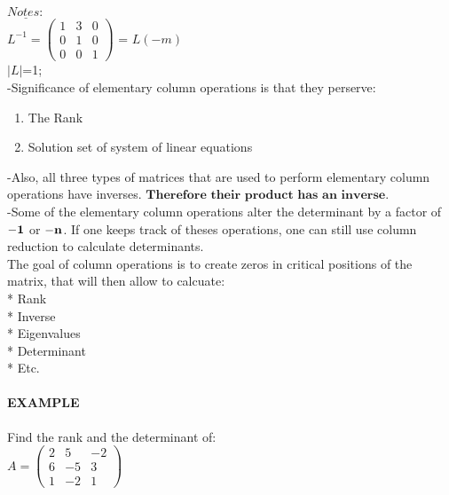 \documentclass[]{article}
\let\oldparagraph\paragraph
\renewcommand{\paragraph}[1]{\oldparagraph{#1}\mbox{}}
\begin{document}
\(\underline{Notes:}\)\\

\(L^{-1} =\begin{pmatrix} 1 & 3 & 0\\ 0 & 1 & 0 \\ 0 & 0 & 1 \end{pmatrix}\)
= \(L(-m)\)\\
 \(|L|\)=1;\\

-Significance of elementary column operations is that they perserve:

\begin{enumerate}
\def\labelenumi{\arabic{enumi})}
\item
  The Rank
\item
  Solution set of system of linear equations
\end{enumerate}

-Also, all three types of matrices that are used to perform elementary
column operations have inverses.
\(\textbf{Therefore their product has an inverse.}\)\\

-Some of the elementary column operations alter the determinant by a
factor of \(\bold{-1}\) or \(\bold{-n}\). If one keeps track of theses
operations, one can still use column reduction to calculate
determinants.\\

The goal of column operations is to create zeros in critical positions
of the matrix, that will then allow to calcuate:\\
 * Rank\\
 * Inverse\\
 * Eigenvalues\\
 * Determinant\\
 * Etc.\\

\paragraph{\texorpdfstring{EXAMPLE\\
}{EXAMPLE }}\label{example-11}

Find the rank and the determinant of:\\

\(A =\begin{pmatrix} 2 & 5 & -2\\ 6 & -5 & 3 \\ 1 & -2 & 1 \end{pmatrix}\)\\
\end{document}

